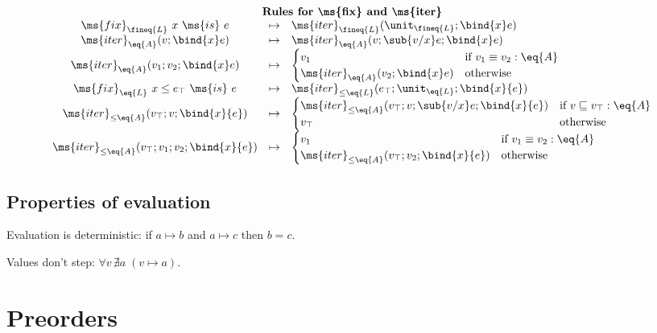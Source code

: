 \documentclass{article}
\newcommand{\ale}{\sqsubseteq}
\newcommand{\aeq}{\equiv}
\newcommand{\tfix}[2]{\ms{fix}_{#1}~{#2}~\ms{is}~}
\newcommand{\tfixle}[3]{\tfix{#1}{#2 \le #3}}
\newcommand{\iter}[4]{\ms{iter}_{#1}({#2}; \bind{#3}#4)}
\newcommand{\iterstep}[5]{\ms{iter}_{#1}({#2}; {#3}; {\bind{#4}#5})}
\newcommand{\iterle}[5]{\ms{iter}_{{\le}#1}({#2}; {#3}; \bind{#4}{#5})}
\newcommand{\iterlestep}[6]{\ms{iter}_{{\le}#1}({#2}; {#3}; {#4}; \bind{#5}{#6})}
\newcommand{\step}{\mapsto}
\begin{document}
\[\begin{array}{ccl}
  \vspace{0.5em}\\
  \multicolumn{3}{c}{\textbf{Rules for \ms{fix} and \ms{iter}}}\\
  \tfix{\fineq{L}}{x}{e} &\step& \iter{\fineq{L}}{\unit_{\fineq{L}}}{x}{e}\\
  \iter{\eq{A}}{v}{x}{e} &\step& \iterstep{\eq{A}}{v}{\sub{v/x} e}{x}{e}\\
  \iterstep{\eq{A}}{v_1}{v_2}{x}{e}
  &\step& \begin{cases}
    v_1 & \text{if}~{v_1 \aeq v_2 : \eq{A}}\\
    \iter{\eq{A}}{v_2}{x}{e} & \text{otherwise}
  \end{cases}\\
  \tfixle{\eq{L}}{x}{e_\top}{e} &\step& \iterle{\eq{L}}{e_\top}{\unit_{\eq{L}}}{x}{e}\\
  \iterle{\eq{A}}{v_\top}{v}{x}{e}
  &\step& \begin{cases}
    \iterlestep{\eq{A}}{v_\top}{v}{\sub{v/x} e}{x}{e} & \text{if}~{v \ale v_\top : \eq{A}}\\
    v_\top & \text{otherwise}
  \end{cases}\\
  \iterlestep{\eq{A}}{v_\top}{v_1}{v_2}{x}{e}
  &\step& \begin{cases}
    v_1 &\text{if}~{v_1 \aeq v_2 : \eq{A}}\\
    \iterle{\eq{A}}{v_\top}{v_2}{x}{e} & \text{otherwise}
  \end{cases}
\end{array}
\]

\subsection{Properties of evaluation}

\begin{theorem}\label{thm:determinism}
  Evaluation is deterministic: if $a \step b$ and $a \step c$ then $b = c$.
\end{theorem}

\begin{theorem}\label{thm:valuesdontstep}
  Values don't step: $\forall v\, \nexists a\; (v \step a)$.
\end{theorem}



\section{Preorders}
\end{document}
